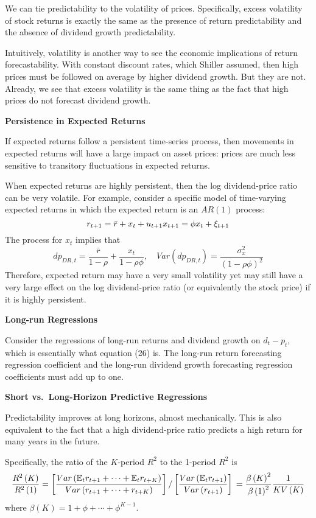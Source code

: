 \documentclass[
]{book}
\begin{document}
We can tie predictability to the volatility of prices. Specifically, excess volatility of stock returns is exactly the same as the presence of return predictability and the absence of dividend growth predictability.

Intuitively, volatility is another way to see the economic implications of return forecastability. With constant discount rates, which Shiller assumed, then high prices must be followed on average by higher dividend growth. But they are not. Already, we see that excess volatility is the same thing as the fact that high prices do not forecast dividend growth.

\textbf{Persistence in Expected Returns}

If expected returns follow a persistent time-series process, then movements in expected returns will have a large impact on asset prices: prices are much less sensitive to transitory fluctuations in expected returns.

When expected returns are highly persistent, then the log dividend-price ratio can be very volatile. For example, consider a specific model of time-varying expected returns in which the expected return is an \(AR\left(1\right)\) process:
\[
r_{t+1}=\bar{r}+x_{t}+u_{t+1}\\x_{t+1}=\phi x_{t}+\xi_{t+1}
\]
The process for \(x_t\) implies that
\[
dp_{DR,t}=\frac{\bar{r}}{1-\rho}+\frac{x_{t}}{1-\rho\phi},\quad Var\left(dp_{DR,t}\right)=\frac{\sigma_{x}^{2}}{\left(1-\rho\phi\right)^{2}}
\]
Therefore, expected return may have a very small volatility yet may still have a very large effect on the log dividend-price ratio (or equivalently the stock price) if it is highly persistent.

\textbf{Long-run Regressions}

Consider the regressions of long-run returns and dividend growth on \(d_t-p_t\), which is essentially what equation (26) is. The long-run return forecasting regression coefficient and the long-run dividend growth forecasting regression coefficients must add up to one.

\textbf{Short vs.~Long-Horizon Predictive Regressions}

Predictability improves at long horizons, almost mechanically. This is also equivalent to the fact that a high dividend-price ratio predicts a high return for many years in the future.

Specifically, the ratio of the \(K\)-period \(R^{2}\) to the 1-period \(R^{2}\) is
\[
\frac{R^{2}\left(K\right)}{R^{2}\left(1\right)}=\left[\frac{Var\left(\mathbb{E}_{t}r_{t+1}+\cdots+\mathbb{E}_{t}r_{t+K}\right)}{Var\left(r_{t+1}+\cdots+r_{t+K}\right)}\right]/\left[\frac{Var\left(\mathbb{E}_{t}r_{t+1}\right)}{Var\left(r_{t+1}\right)}\right]\\=\frac{\beta\left(K\right)^{2}}{\beta\left(1\right)^{2}}\frac{1}{KV\left(K\right)}
\]
where \(\beta\left(K\right)=1+\phi+\cdots+\phi^{K-1}\).
\end{document}
